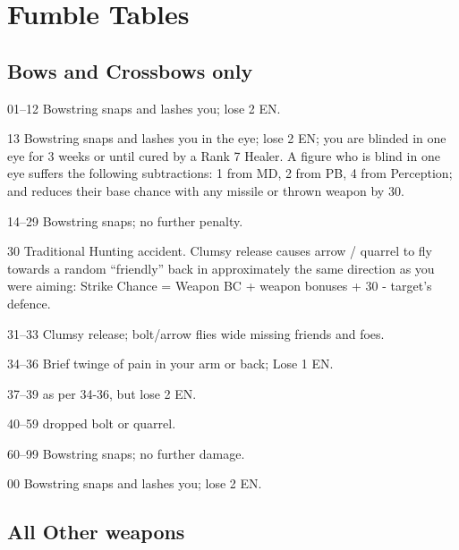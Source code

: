 \section{Fumble Tables}

\begin{multicols*}{3}
\subsection{Bows and Crossbows only}
\label{tables:fumble1}
\begin{Description}

\item[01--12] Bowstring snaps and lashes you; lose 2 EN.

\item[13] Bowstring snaps and lashes you in the eye; lose 2 EN; you are
blinded in one eye for 3 weeks or until cured by a Rank 7 Healer. A
figure who is blind in one eye suffers the following subtractions: 1
from MD, 2 from PB, 4 from Perception; and reduces their base chance
with any missile or thrown weapon by 30.

\item[14--29] Bowstring snaps; no further penalty. 

\item[30] Traditional Hunting accident. Clumsy release causes
arrow / quarrel to fly towards a random ``friendly'' back in
approximately the same direction as you were aiming: Strike Chance =
Weapon BC + weapon bonuses + 30 - target's defence.

\item[31--33] Clumsy release; bolt/arrow flies wide missing friends and foes.

\item[34--36] Brief twinge of pain in your arm or back; Lose 1 EN.

\item[37--39] as per 34-36, but lose 2 EN.

\item[40--59] dropped bolt or quarrel.

\item[60--99] Bowstring snaps; no further damage.

\item[00] Bowstring snaps and lashes you; lose 2 EN.

\end{Description}

\subsection{All Other weapons}
\label{tables:fumble2}


\end{multicols*}
